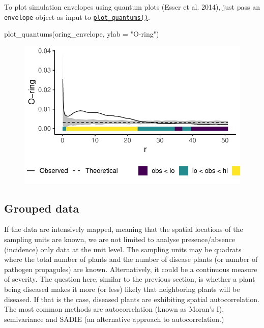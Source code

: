 \documentclass[
  letterpaper,
  DIV=11,
  numbers=noendperiod]{scrreprt}
\newenvironment{Shaded}{\begin{snugshade}}{\end{snugshade}}
\newcommand{\AttributeTok}[1]{\textcolor[rgb]{0.40,0.45,0.13}{#1}}
\newcommand{\FunctionTok}[1]{\textcolor[rgb]{0.28,0.35,0.67}{#1}}
\newcommand{\NormalTok}[1]{\textcolor[rgb]{0.00,0.23,0.31}{#1}}
\newcommand{\StringTok}[1]{\textcolor[rgb]{0.13,0.47,0.30}{#1}}
\begin{document}
To plot simulation envelopes using quantum plots (Esser et al. 2014),
just pass an \texttt{envelope} object as input to
\href{https://r-spatialecology.github.io/onpoint/reference/plot_quantums.html}{\texttt{plot\_quantums()}}.

\begin{Shaded}
\begin{Highlighting}[]
\FunctionTok{plot\_quantums}\NormalTok{(oring\_envelope, }\AttributeTok{ylab =} \StringTok{"O{-}ring"}\NormalTok{)}
\end{Highlighting}
\end{Shaded}

\begin{figure}[H]

{\centering \includegraphics{spatial-tests_files/figure-pdf/unnamed-chunk-42-1.pdf}

}

\end{figure}

\hypertarget{grouped-data}{%
\subsection{Grouped data}\label{grouped-data}}

If the data are intensively mapped, meaning that the spatial locations
of the sampling units are known, we are not limited to analyse
presence/absence (incidence) only data at the unit level. The sampling
units may be quadrats where the total number of plants and the number of
disease plants (or number of pathogen propagules) are known.
Alternatively, it could be a continuous measure of severity. The
question here, similar to the previous section, is whether a plant being
diseased makes it more (or less) likely that neighboring plants will be
diseased. If that is the case, diseased plants are exhibiting spatial
autocorrelation. The most common methods are autocorrelation (known as
Moran's I), semivariance and SADIE (an alternative approach to
autocorrelation.)
\end{document}
